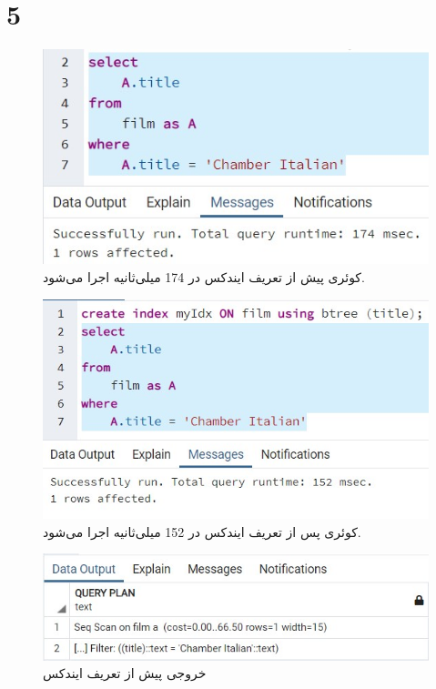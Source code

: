 \documentclass{article}
\begin{document}
\section{5}
\begin{figure}[H]
    \centering
    \includegraphics[width=1\textwidth]{figures/5-a.jpg}
    \caption
	{
کوئری پیش از تعریف ایندکس در 174 میلی‌ثانیه اجرا می‌شود.
	}
    \label{fig:fig1}
\end{figure}
\begin{figure}[H]
    \centering
    \includegraphics[width=1\textwidth]{figures/5-b.jpg}
    \caption
	{
کوئری پس از تعریف ایندکس در 152 میلی‌ثانیه اجرا می‌شود.
	}
    \label{fig:fig1}
\end{figure}
\begin{figure}[H]
    \centering
    \includegraphics[width=1\textwidth]{figures/5-c.jpg}
    \caption
	{
خروجی  پیش از تعریف ایندکس
	}
    \label{fig:fig1}
\end{figure}
\end{document}
